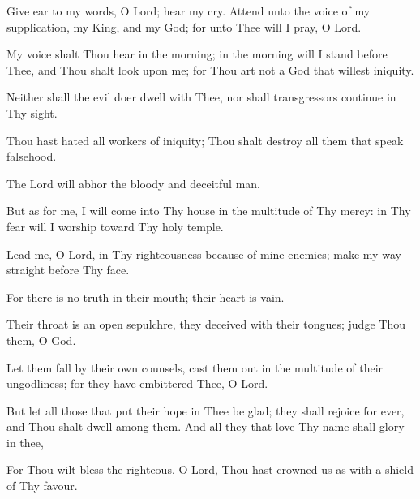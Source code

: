 Give ear to my words, O Lord; hear my cry. Attend unto the voice of my supplication, my King, and my God; for unto Thee will I pray, O Lord.

My voice shalt Thou hear in the morning; in the morning will I stand before Thee, and Thou shalt look upon me; for Thou art not a God that willest iniquity.

Neither shall the evil doer dwell with Thee, nor shall transgressors continue in Thy sight.

Thou hast hated all workers of iniquity; Thou shalt destroy all them that speak falsehood.

The Lord will abhor the bloody and deceitful man.

But as for me, I will come into Thy house in the multitude of Thy mercy: in Thy fear will I worship toward Thy holy temple.

Lead me, O Lord, in Thy righteousness because of mine enemies; make my way straight before Thy face.

For there is no truth in their mouth; their heart is vain.

Their throat is an open sepulchre, they deceived with their tongues; judge Thou them, O God.

Let them fall by their own counsels, cast them out in the multitude of their ungodliness; for they have embittered Thee, O Lord.

But let all those that put their hope in Thee be glad; they shall rejoice for ever, and Thou shalt dwell among them. And all they that love Thy name shall glory in thee,

For Thou wilt bless the righteous. O Lord, Thou hast crowned us as with a shield of Thy favour.
